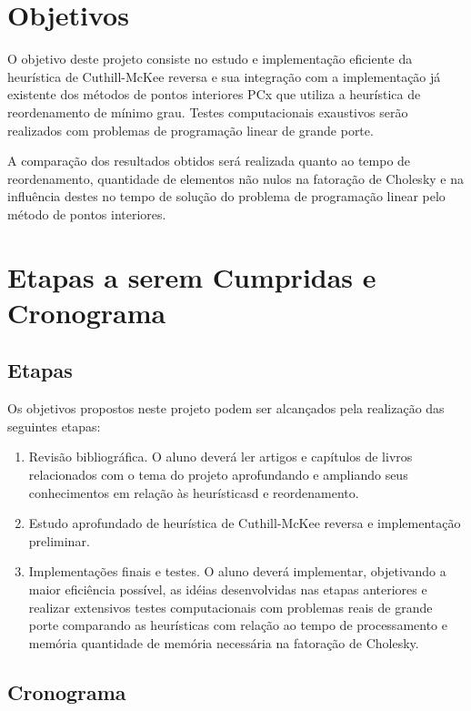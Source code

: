 \documentclass[12pt]{article}
\begin{document}
\section{Objetivos}

O objetivo deste projeto consiste no estudo e implementação eficiente
da heurística de Cuthill-McKee reversa e sua integração com a implementação
já existente dos métodos de pontos interiores PCx \cite{CMWW96} que utiliza a
heurística
de reordenamento de mínimo grau. Testes computacionais exaustivos serão
realizados com problemas de programação linear de grande porte.

A comparação dos resultados obtidos será realizada quanto ao tempo de
reordenamento, quantidade de elementos não nulos na fatoração de Cholesky
e na influência destes no tempo de solução do problema de programação linear
pelo método de pontos interiores.

\section{Etapas a serem Cumpridas e Cronograma}

\subsection{Etapas}

Os objetivos propostos neste projeto podem ser alcançados pela realização das
seguintes etapas:
\begin{enumerate}
\item Revisão bibliográfica. O aluno deverá ler artigos e capítulos de livros
relacionados com o tema do projeto aprofundando e ampliando seus
conhecimentos em relação às heurísticasd e reordenamento.
\item Estudo aprofundado de heurística de Cuthill-McKee reversa e implementação
preliminar.
\item Implementações finais e testes. O aluno deverá implementar, objetivando
a maior eficiência possível, as idéias desenvolvidas nas etapas anteriores
e realizar extensivos testes computacionais com problemas reais de grande porte
comparando as heurísticas com relação ao tempo de processamento e memória
quantidade de memória necessária na fatoração de Cholesky.
\end{enumerate}

\subsection{Cronograma}
\end{document}
